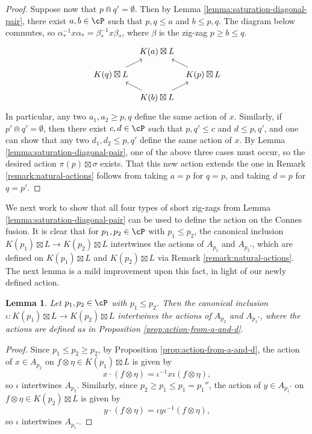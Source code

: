 \documentclass[11pt,reqno]{amsart}
\numberwithin{equation}{section}
\theoremstyle{plain}
\newtheorem{lemma}[equation]{Lemma}
\theoremstyle{definition}
\begin{document}
\begin{proof}
    Suppose now that $p\Cap q'=\emptyset$. Then by Lemma \ref{lemma:saturation-diagonal-pair}, there exist $a,b\in{\cP}$ such that $p,q\leq a$ and $b\leq p,q$. The diagram below commutes, so $\alpha_*^{-1}x\alpha_*=\beta_*^{-1}x\beta_*$, where $\beta$ is the zig-zag $p\geq b\leq q$.
    \[
\begin{tikzcd}[column sep=.5em, row sep=.5em]
	& {K(a)\boxtimes L} & \\
	\\
	{K(q)\boxtimes L} && {K(p)\boxtimes L} \\
	\\
	& {K(b)\boxtimes L}
	\arrow[from=3-1, to=1-2]
	\arrow[from=3-3, to=1-2]
	\arrow[from=5-2, to=3-1]
	\arrow[from=5-2, to=3-3]
\end{tikzcd}
\]
In particular, any two $a_1,a_2\geq p,q$ define the same action of $x$. Similarly, if $p'\Cap q'=\emptyset$, then there exist $c,d\in{\cP}$ such that $p,q'\leq c$ and $d\leq p,q'$, and one can show that any two $d_1,d_2\leq p,q'$ define the same action of $x$. By Lemma \ref{lemma:saturation-diagonal-pair}, one of the above three cases must occur, so the desired action $\pi(p)\boxtimes \sigma$ exists. That this new action extends the one in Remark \ref{remark:natural-actions} follows from taking $a=p$ for $q=p$, and taking $d=p$ for $q=p'$.
\end{proof}

We next work to show that all four types of short zig-zags from Lemma \ref{lemma:saturation-diagonal-pair} can be used to define the action on the Connes fusion. It is clear that for $p_1,p_2\in{\cP}$ with $p_1\leq p_2$, the canonical inclusion $K(p_1)\boxtimes L\to K(p_2)\boxtimes L$ intertwines the actions of $A_{p_1}$ and $A_{p_2'}$, which are defined on $K(p_1)\boxtimes L$ and $K(p_2)\boxtimes L$ via Remark \ref{remark:natural-actions}. The next lemma is a mild improvement upon this fact, in light of our newly defined action.

\begin{lemma}\label{lemma:inclusions-partially-intertwine}
    Let $p_1,p_2\in{\cP}$ with $p_1\leq p_2$. Then the canonical inclusion $\iota:K(p_1)\boxtimes L\to K(p_2)\boxtimes L$ intertwines the actions of $A_{p_2}$ and $A_{p_1'}$, where the actions are defined as in Proposition \ref{prop:action-from-a-and-d}.
\end{lemma}

\begin{proof}
    Since $p_1\leq p_2\geq p_2$, by Proposition \ref{prop:action-from-a-and-d}, the action of $x\in A_{p_2}$ on $f\otimes\eta\in K(p_1)\boxtimes L$ is given by
    \[
    x\cdot(f\otimes\eta)=\iota^{-1}x\iota(f\otimes\eta),
    \]
    so $\iota$ intertwines $A_{p_2}$. Similarly, since $p_2\geq p_1\leq p_1=p_1''$, the action of $y\in A_{p_1'}$ on $f\otimes\eta\in K(p_2)\boxtimes L$ is given by
    \[
    y\cdot(f\otimes\eta)=\iota y\iota^{-1}(f\otimes\eta),
    \]
    so $\iota$ intertwines $A_{p_1'}$.
\end{proof}
\end{document}
